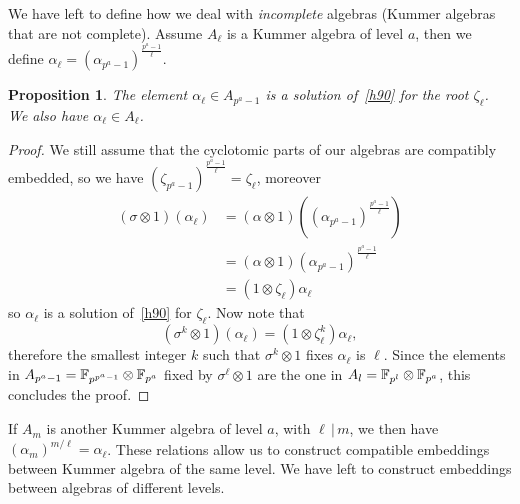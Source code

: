 \documentclass{sig-alternate}
\newtheorem{proposition}{Proposition}
\begin{document}
We have left to define how we deal with \emph{incomplete} algebras (Kummer
algebras that are not complete). Assume $A_\ell$ is a Kummer algebra of level
$a$, then we define $\alpha_\ell = (\alpha_{p^a-1})^{\frac{p^a-1}{\ell}}$.
\begin{proposition}
  The element $\alpha_\ell\in A_{p^a-1}$ is a solution of~\eqref{h90} for the
  root $\zeta_\ell$. We also have $\alpha_\ell\in A_\ell$.
\end{proposition}
\begin{proof}
We still assume that the cyclotomic parts of our algebras are compatibly
embedded, so we have $(\zeta_{p^a-1})^{\frac{p^a-1}{\ell}} = \zeta_\ell$,
moreover
\begin{align*}
  (\sigma\otimes1)(\alpha_\ell) &=
  (\alpha\otimes1)((\alpha_{p^a-1})^{\frac{p^a-1}{\ell}}) \\
  &= (\alpha\otimes1)(\alpha_{p^a-1})^{\frac{p^a-1}{\ell}} \\
  &= (1\otimes\zeta_\ell)\alpha_\ell
\end{align*}
so $\alpha_\ell$ is a solution of~\eqref{h90} for $\zeta_\ell$. Now note that 
\[
  (\sigma^k\otimes1)(\alpha_\ell) = (1\otimes\zeta_\ell^k)\alpha_\ell,
\]
therefore the smallest integer $k$ such that $\sigma^k\otimes1$ fixes
$\alpha_\ell$ is $\ell$. Since the elements in
$A_{p^a-1}=\mathbb{F}_{p^{p^a-1}}\otimes\mathbb{F}_{p^a}$ fixed by
$\sigma^\ell\otimes1$ are the one in
$A_l = \mathbb{F}_{p^l}\otimes\mathbb{F}_{p^a}$, this concludes the
proof.
\end{proof}
If $A_m$ is another Kummer algebra of level $a$, with $\ell\,|\,m$, we then have
$(\alpha_m)^{m/\ell} = \alpha_\ell$. These relations allow us to construct
compatible embeddings between Kummer algebra of the same level. We have left to
construct embeddings between algebras of different levels.
\end{document}

